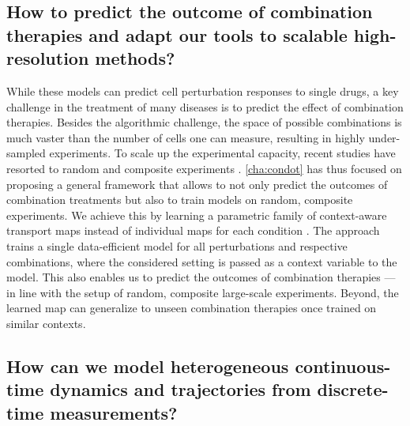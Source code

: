 \subsection*{\textbf{How to predict the outcome of combination therapies and adapt our tools to scalable high-resolution methods?}}

 While these models can predict cell perturbation responses to single drugs, a key challenge in the treatment of many diseases is to predict the effect of combination therapies. Besides the algorithmic challenge, the space of possible combinations is much vaster than the number of cells one can measure, resulting in highly under-sampled experiments. To scale up the experimental capacity, recent studies have resorted to random and composite experiments \citep{norman2019exploring, cleary2020necessity}.
\cref{cha:condot} has thus focused on proposing a general framework that allows to not only predict the outcomes of combination treatments but also to train models on random, composite experiments.
We achieve this by learning a parametric family of context-aware transport maps instead of individual maps for each condition \citep{bunne2022supervised}.
The approach trains a single data-efficient model for all perturbations and respective combinations, where the considered setting is passed as a context variable to the model. 
This also enables us to predict the outcomes of combination therapies ---in line with the setup of random, composite large-scale experiments.
Beyond, the learned map can generalize to unseen combination therapies once trained on similar contexts.


\subsection*{\textbf{How can we model heterogeneous continuous-time dynamics and trajectories from discrete-time measurements?}}

